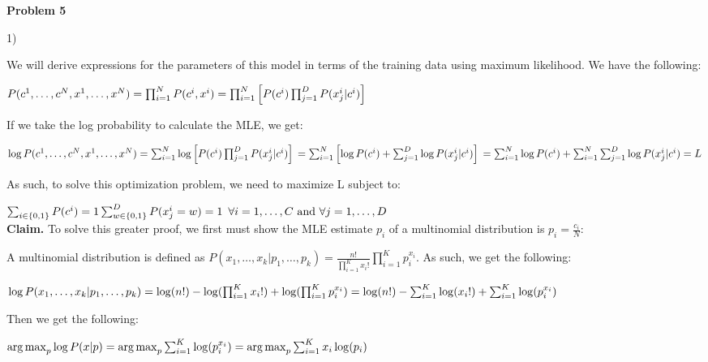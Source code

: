 \textbf{Problem 5}

1) 

We will derive expressions for the parameters of this model in terms of the training data using maximum likelihood. We have the following:

$P(c^1, \dots, c^N, x^1, \dots, x^N) \\
= \prod_{i = 1}^N P(c^i, x^i) \\
= \prod_{i = 1}^{N} \left[ P(c^i)\prod_{j = 1}^{D}P(x_j^i \vert c^i) \right]$

If we take the log probability to calculate the MLE, we get:

$\log P(c^1, \dots, c^N, x^1, \dots, x^N) \\
= \sum_{i = 1}^N \log \left[ P(c^i)\prod_{j = 1}^{D}P(x_j^i \vert c^i) \right] \\
= \sum_{i = 1}^N \left[ \log P(c^i) + \sum_{j = 1}^{D}\log P(x_j^i \vert c^i) \right] \\
= \sum_{i = 1}^N \log P(c^i) + \sum_{i = 1}^{N}\sum_{j = 1}^{D}\log P(x_j^i \vert c^i) = L \\$

As such, to solve this optimization problem, we need to maximize L subject to:

$\sum_{i \in \{0, 1\}} P(c^i) = 1 \\
\sum_{w \in \{0, 1\}}^D P(x_j^i = w) = 1 \thinspace\thinspace\thinspace \forall i = 1, \dots, C \text{ and } \forall j = 1, \dots, D$\\

\textbf{Claim.} To solve this greater proof, we first must show the MLE estimate $p_i$ of a multinomial distribution is $p_i = \frac{c_i}{N}$:

A multinomial distribution is defined as $P(x_1, \dots, x_k \vert p_1, \dots, p_k) = \frac{n!}{\prod_{i = 1}^{K} x_i!}\prod_{i = 1}^{K} p_i^{x_i}$. As such, we get the following:

$\log P(x_1, \dots, x_k \vert p_1, \dots, p_k) \\
= \log(n!) - \log(\prod_{i = 1}^{K} x_i!) + \log(\prod_{i = 1}^{K} p_i^{x_i}) \\
= \log(n!) - \sum_{i = 1}^{K}\log(x_i!) + \sum_{i = 1}^{K}\log(p_i^{x_i})$

Then we get the following:

$\operatorname*{arg\,max}_p \log P(x \vert p) \\
= \operatorname*{arg\,max}_p \sum_{i = 1}^{K} \log(p_i^{x_i}) \\
= \operatorname*{arg\,max}_p \sum_{i = 1}^{K} x_i\log(p_i)$

